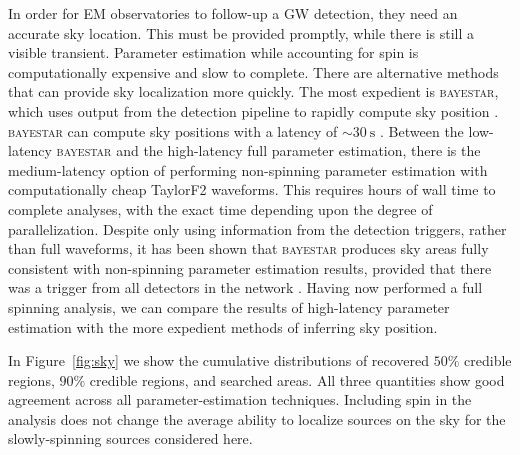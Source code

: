 In order for EM observatories to follow-up a GW detection, they need an accurate sky location. This must be provided promptly, while there is still a visible transient. Parameter estimation while accounting for spin is computationally expensive and slow to complete. There are alternative methods that can provide sky localization more quickly. The most expedient is \textsc{bayestar}, which uses output from the detection pipeline to rapidly compute sky position \citep{Singer_2014}. \textsc{bayestar} can compute sky positions with a latency of $\sim30~\mathrm{s}$ \citep{Berry_2014}. Between the low-latency \textsc{bayestar} and the high-latency full parameter estimation, there is the medium-latency option of performing non-spinning parameter estimation with computationally cheap TaylorF2 waveforms. This requires hours of wall time to complete analyses, with the exact time depending upon the degree of parallelization. Despite only using information from the detection triggers, rather than full waveforms, it has been shown that \textsc{bayestar} produces sky areas fully consistent with non-spinning parameter estimation results, provided that there was a trigger from all detectors in the network \citep{Singer_2014,Berry_2014}. Having now performed a full spinning analysis, we can compare the results of high-latency parameter estimation with the more expedient methods of inferring sky position.

In Figure~\ref{fig:sky} we show the cumulative distributions of recovered $50\%$ credible regions, $90\%$ credible regions, and searched areas. All three quantities show good agreement across all parameter-estimation techniques. %
Including spin in the analysis does not change the average ability to localize sources on the sky for the slowly-spinning sources considered here.

  
  
  
  
  
  
  
  